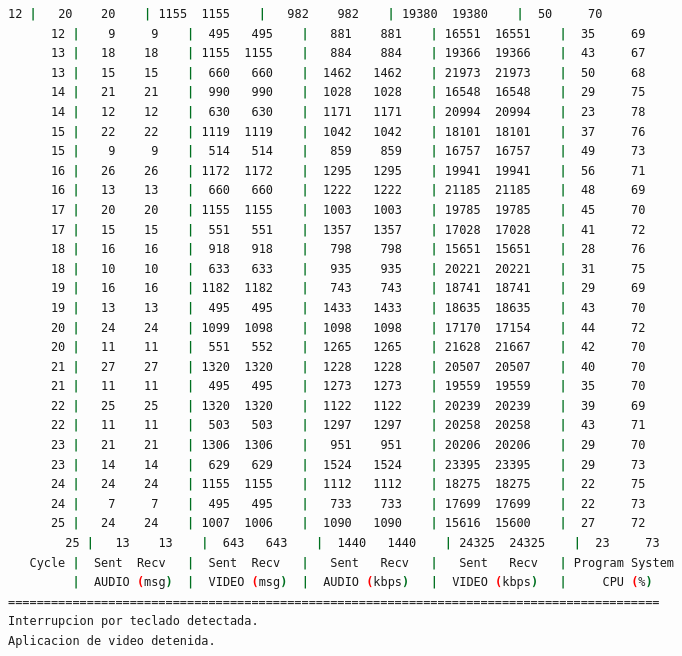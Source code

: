 \begin{adjustbox}{max width=\textwidth}
\begin{lstlisting}[language=bash,basicstyle=\ttfamily\scriptsize]
      12 |   20    20    | 1155  1155    |   982    982    | 19380  19380    |  50     70       
      12 |    9     9    |  495   495    |   881    881    | 16551  16551    |  35     69       
      13 |   18    18    | 1155  1155    |   884    884    | 19366  19366    |  43     67       
      13 |   15    15    |  660   660    |  1462   1462    | 21973  21973    |  50     68       
      14 |   21    21    |  990   990    |  1028   1028    | 16548  16548    |  29     75       
      14 |   12    12    |  630   630    |  1171   1171    | 20994  20994    |  23     78       
      15 |   22    22    | 1119  1119    |  1042   1042    | 18101  18101    |  37     76       
      15 |    9     9    |  514   514    |   859    859    | 16757  16757    |  49     73       
      16 |   26    26    | 1172  1172    |  1295   1295    | 19941  19941    |  56     71       
      16 |   13    13    |  660   660    |  1222   1222    | 21185  21185    |  48     69       
      17 |   20    20    | 1155  1155    |  1003   1003    | 19785  19785    |  45     70       
      17 |   15    15    |  551   551    |  1357   1357    | 17028  17028    |  41     72       
      18 |   16    16    |  918   918    |   798    798    | 15651  15651    |  28     76       
      18 |   10    10    |  633   633    |   935    935    | 20221  20221    |  31     75       
      19 |   16    16    | 1182  1182    |   743    743    | 18741  18741    |  29     69       
      19 |   13    13    |  495   495    |  1433   1433    | 18635  18635    |  43     70       
      20 |   24    24    | 1099  1098    |  1098   1098    | 17170  17154    |  44     72       
      20 |   11    11    |  551   552    |  1265   1265    | 21628  21667    |  42     70       
      21 |   27    27    | 1320  1320    |  1228   1228    | 20507  20507    |  40     70       
      21 |   11    11    |  495   495    |  1273   1273    | 19559  19559    |  35     70       
      22 |   25    25    | 1320  1320    |  1122   1122    | 20239  20239    |  39     69       
      22 |   11    11    |  503   503    |  1297   1297    | 20258  20258    |  43     71       
      23 |   21    21    | 1306  1306    |   951    951    | 20206  20206    |  29     70       
      23 |   14    14    |  629   629    |  1524   1524    | 23395  23395    |  29     73       
      24 |   24    24    | 1155  1155    |  1112   1112    | 18275  18275    |  22     75       
      24 |    7     7    |  495   495    |   733    733    | 17699  17699    |  22     73       
      25 |   24    24    | 1007  1006    |  1090   1090    | 15616  15600    |  27     72       
        25 |   13    13    |  643   643    |  1440   1440    | 24325  24325    |  23     73       
   Cycle |  Sent  Recv   |  Sent  Recv   |   Sent   Recv   |   Sent   Recv   | Program System
         |  AUDIO (msg)  |  VIDEO (msg)  |  AUDIO (kbps)   |  VIDEO (kbps)   |     CPU (%) 
===========================================================================================
Interrupcion por teclado detectada.
Aplicacion de video detenida.


\end{lstlisting}
\end{adjustbox}
